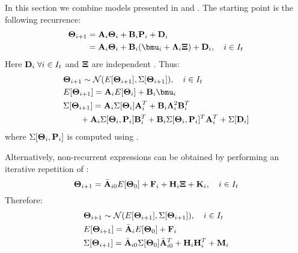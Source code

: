 In this section we combine models presented in  and . The starting point is the following recurrence:
\begin{align}
  \vtemperature_{i + 1} & = \m{A}_i \vtemperature_i + \m{B}_i \vpower_i + \m{D}_i \nonumber \\
  & = \m{A}_i \vtemperature_i + \m{B}_i(\vmean{i} + \ddeviation{i} \vstdnormal) + \m{D}_i, \sep i \in \timeindex \equlabel{fourier-recurrence-noise-process-variation}
\end{align}
Here $\mathbf{D}_i \; \forall i \in I_t$ and $\mathbf{\Xi}$ are independent \mnrvs. Thus:
\begin{align*}
  & \vtemperature_{i + 1} \sim \normal(\expectation{\vtemperature_{i + 1}}, \covariance{\vtemperature_{i + 1}}), \sep i \in \timeindex \\
  & \expectation{\vtemperature_{i + 1}} = \m{A}_i \expectation{\vtemperature_i} + \m{B}_i \vmean{i} \\
  & \covariance{\vtemperature_{i + 1}} = \m{A}_i \covariance{\vtemperature_i} \m{A}_i^T + \m{B}_i \ddeviation{i}^2 \m{B}_i^T \\
  & {} \qquad + \m{A}_i \covariance{\vtemperature_i, \vpower_i} \m{B}_i^T + \m{B}_i \covariance{\vtemperature_i, \vpower_i}^T \m{A}_i^T + \covariance{\m{D}_i}
\end{align*}
where $\Sigma[\mathbf{\Theta}_i, \mathbf{P}_i]$ is computed using .

Alternatively, non-recurrent expressions can be obtained by performing an iterative repetition of :
\begin{equation} \equlabel{fourier-non-recurrent-combined}
  \vtemperature_{i + 1} = \am{A}_{i0} \expectation{\vtemperature_0} + \v{F}_i + \v{H}_i \vstdnormal + \v{K}_i, \sep i \in \timeindex
\end{equation}
Therefore:
\begin{align*}
  & \mathbf{\Theta}_{i + 1} \sim \mathcal{N}(E[\mathbf{\Theta}_{i + 1}], \Sigma[\mathbf{\Theta}_{i + 1}]), \hspace{10pt} i \in I_t \\
  & E[\mathbf{\Theta}_{i + 1}] = \Bar{\mathbf{A}}_i E[\mathbf{\Theta}_0] + \mathbf{F}_i \\
  & \Sigma[\mathbf{\Theta}_{i + 1}] = \Bar{\mathbf{A}}_{i0} \Sigma[\mathbf{\Theta}_0] \Bar{\mathbf{A}}_{i0}^T + \mathbf{H}_i \mathbf{H}_i^T + \mathbf{M}_i
\end{align*}
